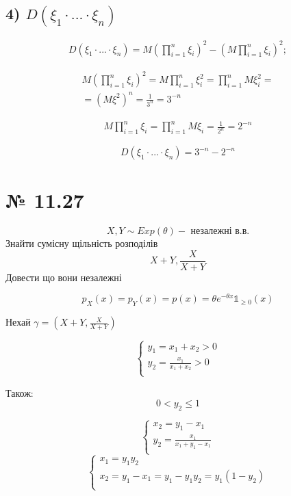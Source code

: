 \documentclass[11pt, a4paper]{article} %
\begin{document}
\subsection*{4) $D(\xi_1 \cdot ... \cdot \xi_n)$}

$$
\begin{gathered}
    D(\xi_1 \cdot ... \cdot \xi_n) = M(\prod_{i=1}^n \xi_i)^2 - (M \prod_{i=1}^n \xi_i)^2;
\end{gathered}
$$

$$\begin{gathered}
    M(\prod_{i=1}^n \xi_i)^2 = M\prod_{i=1}^n \xi_i^2 = \prod_{i=1}^n M\xi_i^2 = \\
= (M\xi^2)^n = \frac{1}{3^n} = 3^{-n}
\end{gathered}$$

$$\begin{gathered}
    M \prod_{i=1}^n \xi_i = \prod_{i=1}^n M\xi_i = \frac{1}{2^n} = 2^{-n}
\end{gathered}$$

\begin{mdframed}[style=ans]
    $$D(\xi_1 \cdot ... \cdot \xi_n) = 3^{-n} - 2^{-n}$$
\end{mdframed}


\section*{№ 11.27}
\begin{mdframed}
    $$X,Y \sim Exp(\theta) - \text{ незалежні в.в.}$$
    Знайти сумісну щільність розподілів
    $$X+Y, \frac{X}{X+Y}$$
    Довести що вони незалежні
\end{mdframed}



$$p_X(x) = p_Y(x) = p(x) = \theta e^{-\theta x} \mathbb{1}_{\ge 0}(x)$$

Нехай $\gamma = (X+Y, \frac{X}{X+Y})$

$$\begin{cases}
    y_1 = x_1+x_2 > 0\\
    y_2 = \frac{x_1}{x_1+x_2} > 0\\
\end{cases}$$

Також:
$$\boxed{0 < y_2 \le 1}$$

$$\begin{cases}
    x_2 = y_1 - x_1 \\
    y_2 = \frac{x_1}{x_1+ y_1 - x_1}\\
\end{cases}$$
$$\begin{cases}
    x_1 = y_1 y_2\\
    x_2 = y_1 - x_1 = y_1 - y_1y_2 = y_1(1-y_2) \\
\end{cases}$$
\end{document}
